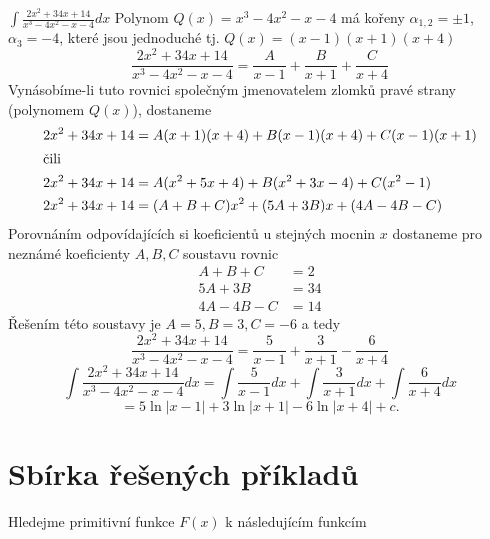       \begin{example}
        $\displaystyle\int{\frac{2x^2+34x+14}{x^3-4x^2-x-4}}dx$ \cite[s.~90]{Knichal}\newline
        Polynom $Q(x)=x^3-4x^2-x-4$ má kořeny $\alpha_{1,2}=\pm1$, $\alpha_{3}=-4$, které jsou
        jednoduché tj. $Q(x)=(x-1)(x+1)(x+4)$ $$\frac{2x^2+34x+14}{x^3-4x^2-x-4} =
        \frac{A}{x-1}+\frac{B}{x+1}+\frac{C}{x+4}$$ Vynásobíme-li tuto rovnici společným
        jmenovatelem zlomků pravé strany (polynomem $Q(x)$), dostaneme
        \footnotesize\begin{align*}
          2x^2+34x+14 &= A(x+1)(x+4)+B(x-1)(x+4)+C(x-1)(x+1) \\
          \shortintertext{čili}
          2x^2+34x+14 &= A(x^2+5x+4)+B(x^2+3x-4)+C(x^2-1) \\
          2x^2+34x+14 &= (A+B+C)x^2+(5A+3B)x + (4A-4B-C)
        \end{align*}\small
        Porovnáním odpovídajících si koeficientů u stejných mocnin $x$  dostaneme pro nez\-ná\-mé
        koeficienty $A, B, C$ soustavu rovnic
        \begin{align*}
           A+   B + C &= 2 \\
          5A + 3B     &= 34 \\
          4A - 4B - C &= 14
        \end{align*}
        Řešením této soustavy je $A = 5, B = 3, C = -6$ a tedy
        $$\frac{2x^2+34x+14}{x^3-4x^2-x-4} = \frac{5}{x-1}+\frac{3}{x+1}-\frac{6}{x+4}$$
        \begin{equation*}
          \int{\frac{2x^2+34x+14}{x^3-4x^2-x-4}}dx 
            = \int{\frac{5}{x-1}}dx + \int{\frac{3}{x+1}}dx + \int{\frac{6}{x+4}}dx            
        \end{equation*}
        \begin{equation*}
            = 5\ln|x-1| +  3\ln|x+1| - 6\ln|x+4| +c.
        \end{equation*}
      \end{example}

  \newpage
  \section{Sbírka řešených příkladů}
    Hledejme primitivní funkce \(F(x)\) k následujícím funkcím
    

\printbibliography[heading=subbibliography]

